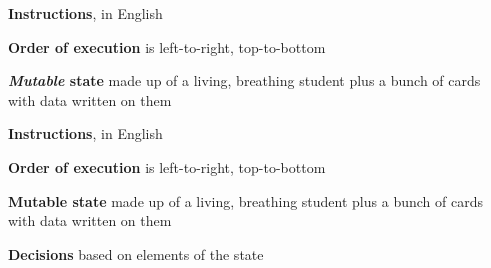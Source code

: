 \documentclass{beamer}
\begin{document}
\begin{slide}{
\item \textbf{Instructions}, in English
\item \textbf{Order of execution} is left-to-right, top-to-bottom
\item \textbf{\textit{Mutable} state} made up of a living, breathing student plus a bunch of cards with data written on them
}\end{slide}


\begin{slide}{
\item \textbf{Instructions}, in English
\item \textbf{Order of execution} is left-to-right, top-to-bottom
\item \textbf{Mutable state} made up of a living, breathing student plus a bunch of cards with data written on them
\item \textbf{Decisions} based on elements of the state 
}\end{slide}
\end{document}
